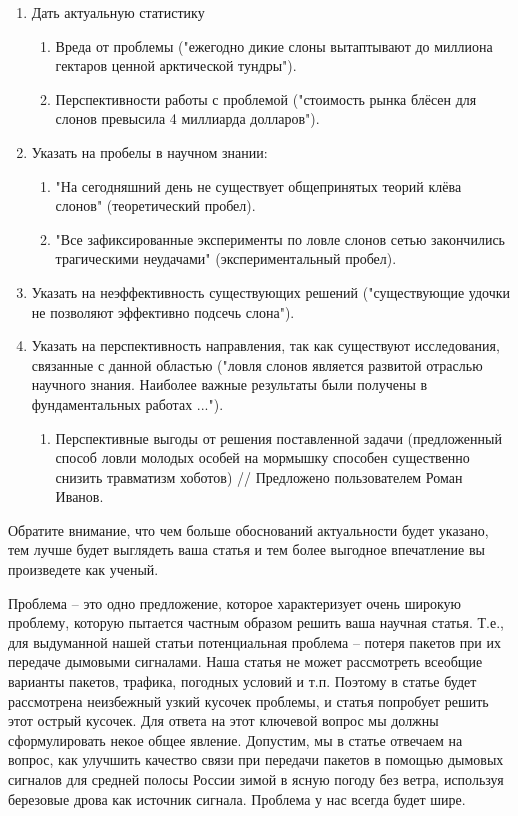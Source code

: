 \documentclass{report}
\begin{document}
\begin{enumerate}
	\item Дать актуальную статистику
		\begin{enumerate}
			\item Вреда от проблемы ("ежегодно дикие слоны вытаптывают до миллиона гектаров ценной арктической тундры").
			\item Перспективности работы с проблемой ("стоимость рынка блёсен для слонов превысила 4 миллиарда долларов").
		\end{enumerate}
	\item Указать на пробелы в научном знании:
		\begin{enumerate}
			\item "На сегодняшний день не существует общепринятых теорий клёва слонов" (теоретический пробел).
			\item "Все зафиксированные эксперименты по ловле слонов сетью закончились трагическими неудачами" (экспериментальный пробел).
		\end{enumerate}
	\item Указать на неэффективность существующих решений ("существующие удочки не позволяют эффективно подсечь слона").
	\item Указать на перспективность направления, так как существуют исследования, связанные с данной областью ("ловля слонов является развитой отраслью научного знания. Наиболее важные результаты были получены в фундаментальных работах ...").
		\begin{enumerate}
			\item Перспективные выгоды от решения поставленной задачи (предложенный способ ловли молодых особей на мормышку способен существенно снизить травматизм хоботов) // Предложено пользователем Роман Иванов.
		\end{enumerate}
\end{enumerate}
Обратите внимание, что чем больше обоснований актуальности будет указано, тем лучше будет выглядеть ваша статья и тем более выгодное впечатление вы произведете как ученый.

Проблема – это одно предложение, которое характеризует очень широкую проблему, которую пытается частным образом решить ваша научная статья. Т.е., для выдуманной нашей статьи потенциальная проблема – потеря пакетов при их передаче дымовыми сигналами. Наша статья не может рассмотреть всеобщие варианты пакетов, трафика, погодных условий и т.п. Поэтому в статье будет рассмотрена неизбежный узкий кусочек проблемы, и статья попробует решить этот острый кусочек. Для ответа на этот ключевой вопрос мы должны сформулировать некое общее явление. Допустим, мы в статье отвечаем на вопрос, как улучшить качество связи при передачи пакетов в помощью дымовых сигналов для средней полосы России зимой в ясную погоду без ветра, используя березовые дрова как источник сигнала. Проблема у нас всегда будет шире.
\end{document}
